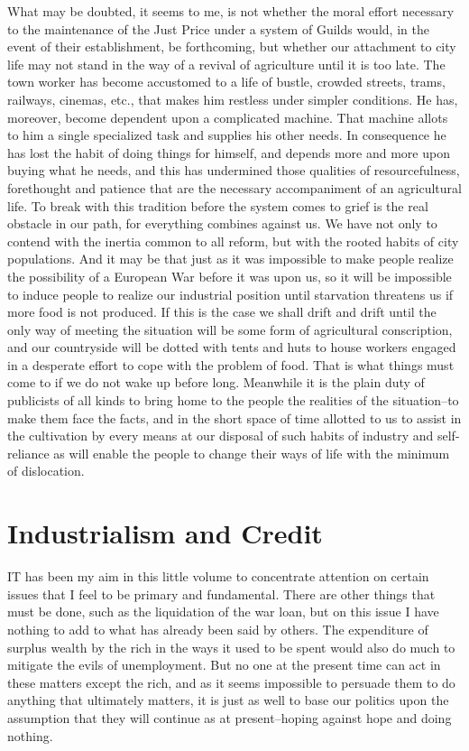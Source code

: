 \documentclass{book}
\begin{document}
What may be doubted, it seems to me, is not whether the moral effort necessary to the maintenance of the Just Price under a system of Guilds would, in the event of their establishment, be forthcoming, but whether our attachment to city life may not stand in the way of a revival of agriculture until it is too late. The town worker has become accustomed to a life of bustle, crowded streets, trams, railways, cinemas, etc., that makes him restless under simpler conditions. He has, moreover, become dependent upon a complicated machine. That machine allots to him a single specialized task and supplies his other needs. In consequence he has lost the habit of doing things for himself, and depends more and more upon buying what he needs, and this has undermined those qualities of resourcefulness, forethought and patience that are the necessary accompaniment of an agricultural life. To break with this tradition before the system comes to grief is the real obstacle in our path, for everything combines against us. We have not only to contend with the inertia common to all reform, but with the rooted habits of city populations. And it may be that just as it was impossible to make people realize the possibility of a European War before it was upon us, so it will be impossible to induce people to realize our industrial position until starvation threatens us if more food is not produced. If this is the case we shall drift and drift until the only way of meeting the situation will be some form of agricultural conscription, and our countryside will be dotted with tents and huts to house workers engaged in a desperate effort to cope with the problem of food. That is what things must come to if we do not wake up before long. Meanwhile it is the plain duty of publicists of all kinds to bring home to the people the realities of the situation–to make them face the facts, and in the short space of time allotted to us to assist in the cultivation by every means at our disposal of such habits of industry and self-reliance as will enable the people to change their ways of life with the minimum of dislocation.

\chapter{Industrialism and Credit}
\label{chapter-12}
IT has been my aim in this little volume to concentrate attention on certain issues that I feel to be primary and fundamental. There are other things that must be done, such as the liquidation of the war loan, but on this issue I have nothing to add to what has already been said by others. The expenditure of surplus wealth by the rich in the ways it used to be spent would also do much to mitigate the evils of unemployment. But no one at the present time can act in these matters except the rich, and as it seems impossible to persuade them to do anything that ultimately matters, it is just as well to base our politics upon the assumption that they will continue as at present–hoping against hope and doing nothing.
\end{document}
